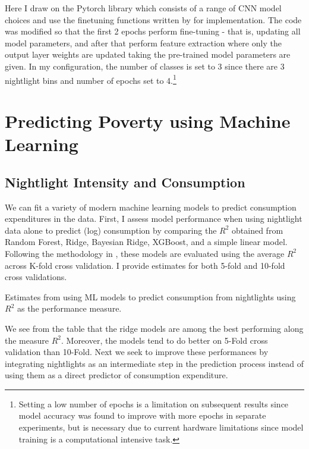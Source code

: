 \documentclass[11pt, a4paper, leqno]{article}
\begin{document}
 Here I draw on the Pytorch library which consists of a range of CNN model choices and use the finetuning functions written by \citet{pytut} for implementation. The code was modified so that the first 2 epochs perform fine-tuning - that is, updating all model parameters, and after that perform feature extraction where only the output layer weights are updated taking the pre-trained model parameters are given. In my configuration, the number of classes is set to 3 since there are 3 nightlight bins and number of epochs set to 4.\footnote{Setting a low number of epochs is a  limitation on subsequent results since model accuracy was found to improve with more epochs in separate experiments, but is necessary due to current hardware limitations since model training is a computational intensive task.}

\section{Predicting Poverty using Machine Learning }

\subsection{Nightlight Intensity and Consumption}

 We can fit a variety of modern machine learning models to predict consumption expenditures in the data. First, I assess model performance when using nightlight data alone to predict (log) consumption by comparing the $R^2$ obtained from Random Forest, Ridge, Bayesian Ridge, XGBoost, and a simple linear model. Following the methodology in \citet{jean2016combining}, these models are evaluated using the average $R^2$ across K-fold cross validation. I provide estimates for both 5-fold and 10-fold cross validations.

\begin{table}[H]
\centering
    \scalebox{1.1}{}
\caption{Estimates from using ML models to predict consumption from nightlights using $R^2$ as the performance measure.}
\end{table}

 We see from the table that the ridge models are among the best performing along the measure $R^2$.  Moreover, the models tend to do better on 5-Fold cross validation than 10-Fold. Next we seek to improve these performances by integrating nightlights as an intermediate step in the prediction process instead of using them as a direct predictor of consumption expenditure. 
\end{document}
